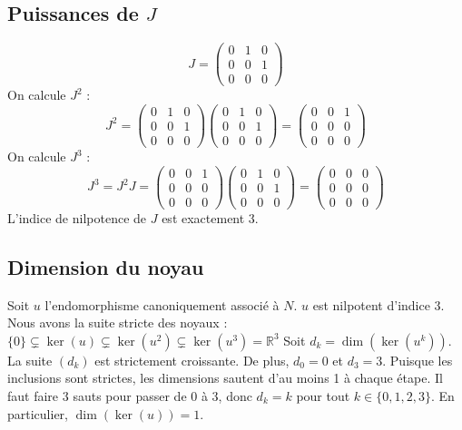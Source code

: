 \documentclass[11pt,a4paper]{article}
\begin{document}
\subsection{Puissances de $J$}
$$J = \begin{pmatrix} 0 & 1 & 0 \\ 0 & 0 & 1 \\ 0 & 0 & 0 \end{pmatrix}$$
On calcule $J^2$ :
$$J^2 = \begin{pmatrix} 0 & 1 & 0 \\ 0 & 0 & 1 \\ 0 & 0 & 0 \end{pmatrix} \begin{pmatrix} 0 & 1 & 0 \\ 0 & 0 & 1 \\ 0 & 0 & 0 \end{pmatrix} = \begin{pmatrix} 0 & 0 & 1 \\ 0 & 0 & 0 \\ 0 & 0 & 0 \end{pmatrix}$$
On calcule $J^3$ :
$$J^3 = J^2 J = \begin{pmatrix} 0 & 0 & 1 \\ 0 & 0 & 0 \\ 0 & 0 & 0 \end{pmatrix} \begin{pmatrix} 0 & 1 & 0 \\ 0 & 0 & 1 \\ 0 & 0 & 0 \end{pmatrix} = \begin{pmatrix} 0 & 0 & 0 \\ 0 & 0 & 0 \\ 0 & 0 & 0 \end{pmatrix}$$
L'indice de nilpotence de $J$ est exactement 3.

\subsection{Dimension du noyau}
Soit $u$ l'endomorphisme canoniquement associé à $N$. $u$ est nilpotent d'indice 3.
Nous avons la suite stricte des noyaux :
$\{0\} \subsetneq \ker(u) \subsetneq \ker(u^2) \subsetneq \ker(u^3) = \mathbb{R}^3$
Soit $d_k = \dim(\ker(u^k))$. La suite $(d_k)$ est strictement croissante.
De plus, $d_0 = 0$ et $d_3 = 3$.
Puisque les inclusions sont strictes, les dimensions sautent d'au moins 1 à chaque étape.
Il faut faire 3 sauts pour passer de 0 à 3, donc $d_k = k$ pour tout $k \in \{0, 1, 2, 3\}$.
En particulier, $\dim(\ker(u)) = 1$.
\end{document}

